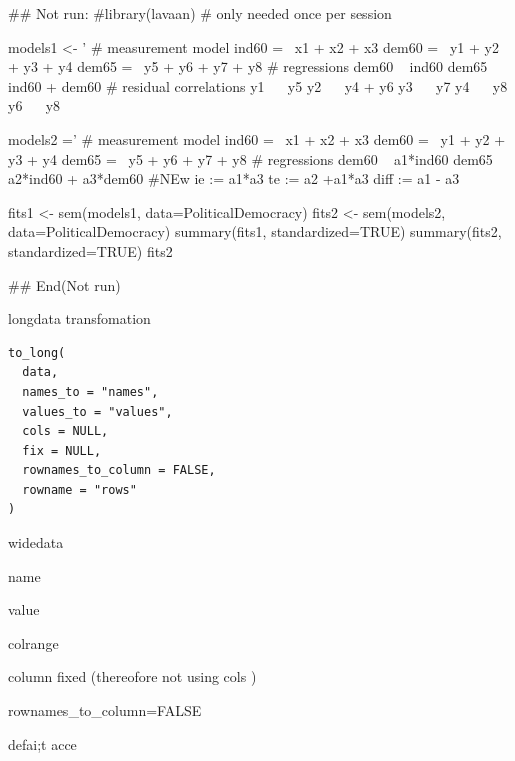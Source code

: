 \documentclass[a4paper]{book}
\begin{document}
\begin{Examples}
\begin{ExampleCode}

## Not run: 
#library(lavaan) # only needed once per session

models1 <- '
  # measurement model
    ind60 =~ x1 + x2 + x3
    dem60 =~ y1 + y2 + y3 + y4
    dem65 =~ y5 + y6 + y7 + y8
    # regressions
    dem60 ~ ind60
    dem65 ~ ind60 + dem60
      # residual correlations
    y1 ~~ y5
    y2 ~~ y4 + y6
    y3 ~~ y7
    y4 ~~ y8
    y6 ~~ y8

models2 ='
  # measurement model
    ind60 =~ x1 + x2 + x3
    dem60 =~ y1 + y2 + y3 + y4
    dem65 =~ y5 + y6 + y7 + y8
     # regressions
    dem60 ~ a1*ind60
    dem65 ~ a2*ind60 + a3*dem60
 #NEw
   ie := a1*a3
   te := a2 +a1*a3
   diff := a1 - a3




fits1 <- sem(models1, data=PoliticalDemocracy)
fits2 <- sem(models2, data=PoliticalDemocracy)
summary(fits1, standardized=TRUE)
summary(fits2, standardized=TRUE)
fits2 %

## End(Not run)

\end{ExampleCode}
\end{Examples}
%
\begin{Description}
longdata transfomation
\end{Description}
%
\begin{Usage}
\begin{verbatim}
to_long(
  data,
  names_to = "names",
  values_to = "values",
  cols = NULL,
  fix = NULL,
  rownames_to_column = FALSE,
  rowname = "rows"
)
\end{verbatim}
\end{Usage}
%
\begin{Arguments}
\begin{ldescription}
\item[\code{data}] widedata

\item[\code{names\_to}] name

\item[\code{values\_to}] value

\item[\code{cols}] colrange

\item[\code{fix}] column fixed (thereofore not using cols )

\item[\code{rownames\_to\_column}] rownames\_to\_column=FALSE

\item[\code{rowname}] defai;t acce
\end{ldescription}
\end{Arguments}
\end{document}
